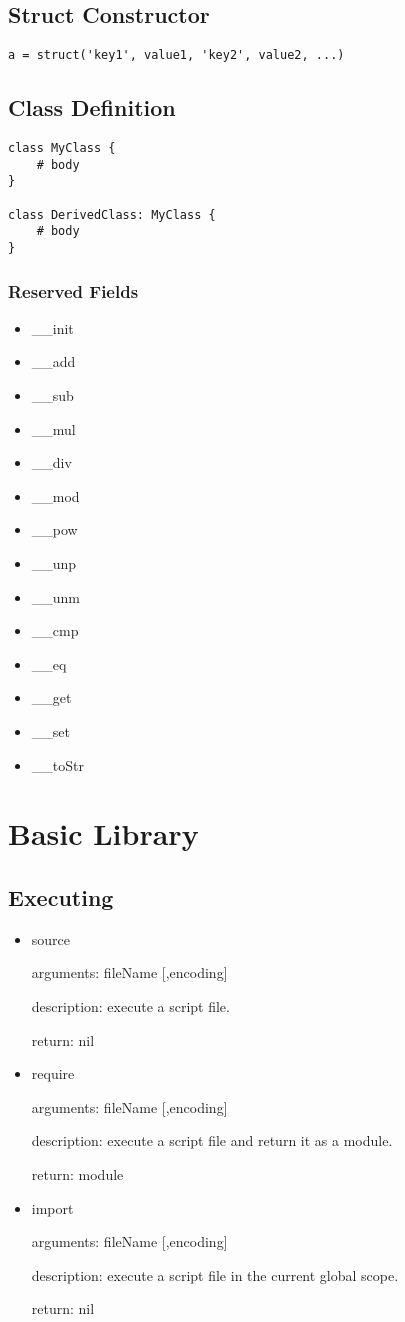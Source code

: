 \documentclass[]{article}
\begin{document}
\subsection{Struct Constructor}
\begin{lstlisting}
a = struct('key1', value1, 'key2', value2, ...)
\end{lstlisting}
\subsection{Class Definition}
\begin{lstlisting}
class MyClass {
	# body
}

class DerivedClass: MyClass {
	# body
}
\end{lstlisting}

\subsubsection{Reserved Fields}
\begin{itemize}
	\item \_\_init
	\item \_\_add
	\item \_\_sub
	\item \_\_mul
	\item \_\_div
	\item \_\_mod
	\item \_\_pow
	\item \_\_unp
	\item \_\_unm
	\item \_\_cmp
	\item \_\_eq
	\item \_\_get
	\item \_\_set
	\item \_\_toStr
\end{itemize}


\section{Basic Library}
\subsection{Executing}
\begin{itemize}
	\item source
	
	arguments: fileName [,encoding]
	
	description: execute a script file.
	
	return: nil
	
	\item require
	
	arguments: fileName [,encoding]
	
	description: execute a script file and return it as a module.
	
	return: module

	\item import
	
	arguments: fileName [,encoding]
	
	description: execute a script file in the current global scope.
	
	return: nil
\end{itemize}
\end{document}
